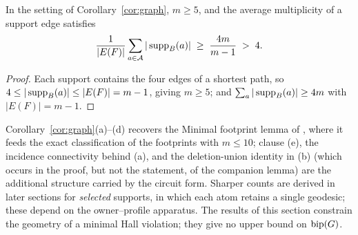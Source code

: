 \begin{corollary}\label{cor:sizes}
In the setting of Corollary~\textup{\ref{cor:graph}}, \(m\ge5\), and
the average multiplicity of a support edge satisfies
\[
 \frac{1}{|E(F)|}\sum_{a\in\mathcal A}|\operatorname{supp}_B(a)|
 \;\ge\;\frac{4m}{m-1}\;>\;4.
\]
\end{corollary}

\begin{proof}
Each support contains the four edges of a shortest path, so
\(4\le|\operatorname{supp}_B(a)|\le|E(F)|=m-1\), giving \(m\ge5\); and
\(\sum_a|\operatorname{supp}_B(a)|\ge4m\) with \(|E(F)|=m-1\).
\end{proof}

\begin{remark}
Corollary~\ref{cor:graph}(a)--(d) recovers the Minimal footprint lemma
of \cite{Ferudun26supports}, where it feeds the exact classification of
the footprints with \(m\le10\); clause (e), the incidence connectivity
behind (a), and the deletion-union identity in (b) (which occurs in the
proof, but not the statement, of the companion lemma) are the
additional structure carried by the circuit form. Sharper counts are
derived in later sections for \emph{selected} supports, in which each
atom retains a single geodesic; these depend on
the owner--profile apparatus. The
results of this section constrain the geometry of a minimal Hall
violation; they give no upper bound on \(\operatorname{bip}(G)\).
\end{remark}
